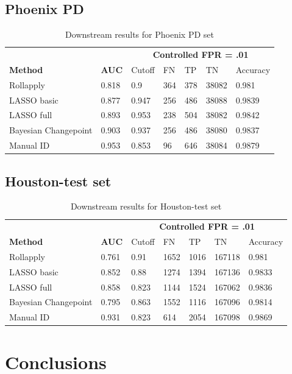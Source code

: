 \documentclass[12pt]{article}
\begin{document}
\subsection{Phoenix PD}

\begin{table}[]
\centering
\caption{Downstream results for Phoenix PD set}
\begin{tabular}{lllllll}
& & \multicolumn{5}{c}{\textbf{Controlled FPR = .01}}\\
\textbf{Method} & \textbf{AUC} & Cutoff & FN &TP & TN & Accuracy \\ \hline
Rollapply & 0.818 &  0.9 & 364 & 378&38082 & 0.981 \\ \hline
LASSO basic & 0.877 &  0.947 &256 & 486&38088 & 0.9839\\ \hline
LASSO full & 0.893 &  0.953 &238 &504 &38082 & 0.9842 \\ \hline
Bayesian Changepoint & 0.903 &  0.937 &256 & 486&38080 & 0.9837\\ \hline
Manual ID & 0.953 &  0.853 & 96& 646&38084 & 0.9879\\ \hline 
\end{tabular}
\end{table}

\subsection{Houston-test set}

\begin{table}[]
\centering
\caption{Downstream results for Houston-test set}
\begin{tabular}{lllllll}
& & \multicolumn{5}{c}{\textbf{Controlled FPR = .01}}\\
\textbf{Method} & \textbf{AUC} & Cutoff & FN &TP & TN & Accuracy \\ \hline
Rollapply & 0.761 &  0.91 & 1652 & 1016&167118 & 0.981 \\ \hline
LASSO basic & 0.852 &  0.88 &1274 & 1394&167136 & 0.9833\\ \hline
LASSO full & 0.858 &  0.823 &1144 &1524 &167062 & 0.9836 \\ \hline
Bayesian Changepoint & 0.795 &  0.863 &1552 & 1116&167096 & 0.9814\\ \hline
Manual ID & 0.931 &  0.823 & 614& 2054&167098 & 0.9869\\ \hline 
\end{tabular}
\end{table}

\section{Conclusions}
\end{document}
